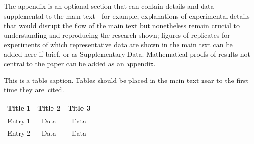 \documentclass[journal,article,submit,moreauthors,pdftex]{Definitions/mdpi}
\begin{document}
\begin{paracol}{2}
    
    
    
    
    \appendixstart
    \appendix
    \section{}
    \subsection{}
    The appendix is an optional section that can contain details and data supplemental to the main text---for example, explanations of experimental details that would disrupt the flow of the main text but nonetheless remain crucial to understanding and reproducing the research shown; figures of replicates for experiments of which representative data are shown in the main text can be added here if brief, or as Supplementary Data. Mathematical proofs of results not central to the paper can be added as an appendix.
    
    \begin{specialtable}[H] 
        \caption{This is a table caption. Tables should be placed in the main text near to the first time they are~cited.\label{tab2}}
        \begin{tabular}{ccc}
            \toprule
            \textbf{Title 1}    & \textbf{Title 2}  & \textbf{Title 3}\\
            \midrule
            Entry 1     & Data          & Data\\
            Entry 2     & Data          & Data\\
            \bottomrule
        \end{tabular}
    \end{specialtable}
    

\end{paracol}
\end{document}
